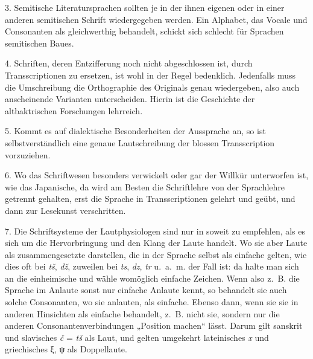 3. Semitische Literatursprachen sollten je in der ihnen eigenen oder in einer anderen semitischen Schrift wiedergegeben werden. Ein Alphabet, das Vocale und Consonanten als gleichwerthig behandelt, schickt sich schlecht für Sprachen semitischen Baues.

4. Schriften, deren Entzifferung noch nicht abgeschlossen ist, durch Transscriptionen zu ersetzen, ist wohl in der Regel bedenklich. Jedenfalls muss die Umschreibung die Orthographie des Originals genau wiedergeben, also auch anscheinende Varianten unterscheiden. Hierin ist die Geschichte der altbaktrischen Forschungen lehrreich.

5. Kommt es auf dialektische Besonderheiten der Aussprache an, so ist selbstverständlich eine genaue Lautschreibung der blossen Transscription vorzuziehen.

6. Wo das Schriftwesen besonders verwickelt oder gar der Willkür unterworfen ist, wie das Japanische, da wird am Besten die Schriftlehre von der \label{sp.135} Sprachlehre getrennt gehalten, erst die Sprache in Transscriptionen gelehrt und geübt, und dann zur Lesekunst verschritten.

7. Die Schriftsysteme der Lautphysiologen sind nur in soweit zu empfehlen, als es sich um die Hervorbringung und den Klang der Laute handelt. Wo sie aber Laute als zusammengesetzte darstellen, die in der \label{fp.144} Sprache selbst als einfache gelten, wie dies oft bei \textit{tš}, \textit{dž}, zuweilen bei \textit{ts}, \textit{dz}, \textit{tr} u.~a.~m. der Fall ist: da halte man sich an die einheimische  und wähle womöglich einfache Zeichen. Wenn also z.~B. die Sprache im Anlaute sonst nur einfache Anlaute kennt, so behandelt sie auch solche Consonanten, wo sie anlauten, als einfache. Ebenso dann, wenn sie sie in anderen Hinsichten als einfache behandelt, z.~B. nicht sie, sondern nur die anderen Consonantenverbindungen „Position machen“ lässt. Darum gilt sanskrit  und slavisches \textit{č} = \textit{tš} als  Laut, und gelten umgekehrt lateinisches \textit{x} und griechisches ξ, ψ als Doppellaute.


